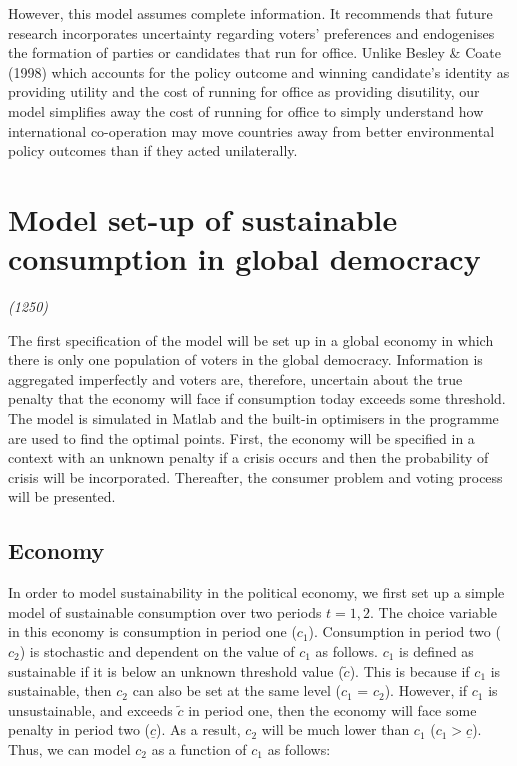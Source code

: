 \documentclass[11pt,preprint, authoryear]{elsarticle}
\numberwithin{equation}{section}
\numberwithin{figure}{section}
\numberwithin{table}{section}
\begin{document}
However, this model assumes complete information. It recommends that
future research incorporates uncertainty regarding voters' preferences
and endogenises the formation of parties or candidates that run for
office. Unlike Besley \& Coate (1998) which accounts for the policy
outcome and winning candidate's identity as providing utility and the
cost of running for office as providing disutility, our model simplifies
away the cost of running for office to simply understand how
international co-operation may move countries away from better
environmental policy outcomes than if they acted unilaterally.

\hypertarget{model-set-up-of-sustainable-consumption-in-global-democracy}{%
\section{Model set-up of sustainable consumption in global
democracy}\label{model-set-up-of-sustainable-consumption-in-global-democracy}}

\emph{(1250)}

The first specification of the model will be set up in a global economy
in which there is only one population of voters in the global democracy.
Information is aggregated imperfectly and voters are, therefore,
uncertain about the true penalty that the economy will face if
consumption today exceeds some threshold. The model is simulated in
Matlab and the built-in optimisers in the programme are used to find the
optimal points. First, the economy will be specified in a context with
an unknown penalty if a crisis occurs and then the probability of crisis
will be incorporated. Thereafter, the consumer problem and voting
process will be presented.

\hypertarget{economy}{%
\subsection*{Economy}\label{economy}}

In order to model sustainability in the political economy, we first set
up a simple model of sustainable consumption over two periods
\(t = 1, 2\). The choice variable in this economy is consumption in
period one (\(c_1\)). Consumption in period two (\(c_2\)) is stochastic
and dependent on the value of \(c_1\) as follows. \(c_1\) is defined as
sustainable if it is below an unknown threshold value (\(\tilde{c}\)).
This is because if \(c_1\) is sustainable, then \(c_2\) can also be set
at the same level (\(c_1\) = \(c_2\)). However, if \(c_1\) is
unsustainable, and exceeds \(\tilde{c}\) in period one, then the economy
will face some penalty in period two (\(\underline{c}\)). As a result,
\(c_2\) will be much lower than \(c_1\) (\(c_1> \underline{c}\)). Thus,
we can model \(c_2\) as a function of \(c_1\) as follows:
\end{document}
